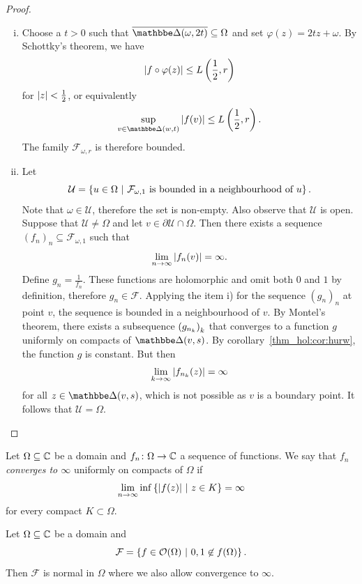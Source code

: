 \begin{proof}
\phantom{a}
\begin{enumerate}[i)]
\item Choose a $t > 0$ such that
$\oline{\dsk(\omega, 2t)} \subseteq \Omega$ and set
$\varphi(z) = 2tz + \omega$. By Schottky's theorem, we have
\[
\left\lvert f \circ \varphi(z)\right\rvert \leq L \left(\frac{1}{2}, r\right)
\]
for $\left\lvert z\right\rvert < \frac{1}{2}$, or equivalently
\[
\sup_{v \in \dsk(w, t)} \abs{f(v)} \leq L \br{\frac{1}{2}, r}.
\]
The family $\mathcal{F}_{\omega, r}$ is therefore bounded.

\item Let
\[
\mathcal{U} =
\left\{u \in \Omega~\middle\vert~\text{$\mathcal{F}_{\omega, 1}$ is bounded in a neighbourhood of
$u$}\right\}.
\]
Note that $\omega \in \mathcal{U}$, therefore the set is non-empty.
Also observe that $\mathcal{U}$ is open. Suppose that
$\mathcal{U} \ne \Omega$ and let
$v \in \partial \mathcal{U} \cap \Omega$. Then there exists a
sequence
$(f_n)_n \subseteq \mathcal{F}_{\omega, 1}$ such that
\[
\lim_{n \to \infty} \left\lvert f_n(v)\right\rvert = \infty.
\]
Define $g_n = \frac{1}{f_n}$. These functions are holomorphic and
omit both $0$ and $1$ by definition, therefore
$g_n \in \mathcal{F}$. Applying the item i) for the sequence
$(g_n)_n$ at point $v$, the sequence is bounded in a neighbourhood
of $v$. By Montel's theorem, there exists a subsequence
$\left(g_{n_k}\right)_k$ that converges to a function $g$ uniformly on
compacts of $\dsk(v, s)$. By corollary~\ref{thm_hol:cor:hurw},
the function $g$ is constant. But then
\[
\lim_{k \to \infty} \left\lvert f_{n_k}(z)\right\rvert = \infty
\]
for all $z \in \dsk(v, s)$, which is not possible as $v$ is a
boundary point. It follows that $\mathcal{U} = \Omega$. \qedhere
\end{enumerate}
\end{proof}

\begin{definicija}
Let $\Omega \subseteq \mathbb{C}$ be a domain and
$f_n \colon \Omega \to \mathbb{C}$ a sequence of functions. We say that
$f_n$ \emph{converges to $\infty$}
uniformly on compacts of $\Omega$ if
\[
\lim_{n \to \infty} \inf \left\{\left\lvert f(z)\right\rvert~\middle\vert~z \in K\right\} = \infty
\]
for every compact $K \subset \Omega$.
\end{definicija}

\begin{izrek}
Let $\Omega \subseteq \mathbb{C}$ be a domain and
\[
\mathcal{F} =
\left\{f \in \mathcal{O}(\Omega)~\middle\vert~0, 1 \not \in f(\Omega)\right\}.
\]
Then $\mathcal{F}$ is normal in $\Omega$ where we also allow
convergence to $\infty$.
\end{izrek}

